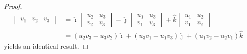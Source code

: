 \begin{proof}
\begin{align*}
\begin{vmatrix}
v_1 & v_2 & v_3
\end{vmatrix} 
&= 
\hat{\imath}
\begin{vmatrix}
u_2 & u_3 \\
v_2 & v_3
\end{vmatrix} 
- \hat{\jmath}
\begin{vmatrix}
u_1 & u_3 \\
v_1 & v_3
\end{vmatrix} 
+ \hat{k}
\begin{vmatrix}
u_1 & u_2 \\
v_1 & v_2
\end{vmatrix} \\
&= (u_2v_3 - u_3v_2)\hat{\imath} + (u_3v_1 - u_1v_3)\hat{\jmath} + (u_1v_2 - u_2v_1)\hat{k}
\end{align*}
yields an identical result.
\end{proof}

